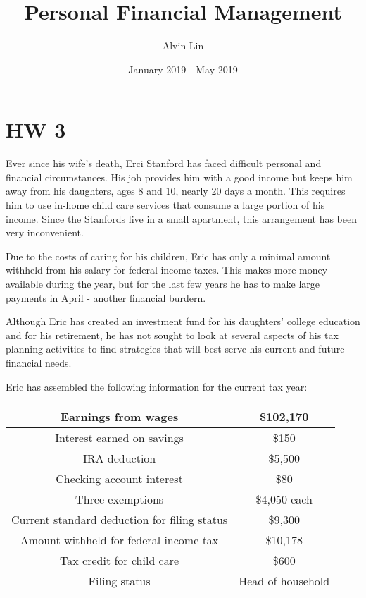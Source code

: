 \documentclass{math}
\title{Personal Financial Management}
\author{Alvin Lin}
\date{January 2019 - May 2019}
\begin{document}
\maketitle

\section*{HW 3}
Ever since his wife's death, Erci Stanford has faced difficult personal and
financial circumstances. His job provides him with a good income but keeps him
away from his daughters, ages 8 and 10, nearly 20 days a month. This requires
him to use in-home child care services that consume a large portion of his
income. Since the Stanfords live in a small apartment, this arrangement has been
very inconvenient. \par
Due to the costs of caring for his children, Eric has only a minimal amount
withheld from his salary for federal income taxes. This makes more money
available during the year, but for the last few years he has to make large
payments in April - another financial burdern. \par
Although Eric has created an investment fund for his daughters' college
education and for his retirement, he has not sought to look at several aspects
of his tax planning activities to find strategies that will best serve his
current and future financial needs. \par
Eric has assembled the following information for the current tax year:
\begin{center}
  \begin{tabular}{|c|c|}
    \hline
    Earnings from wages & \$102,170 \\
    \hline
    Interest earned on savings & \$150 \\
    \hline
    IRA deduction & \$5,500 \\
    \hline
    Checking account interest & \$80 \\
    \hline
    Three exemptions & \$4,050 each \\
    \hline
    Current standard deduction for filing status & \$9,300 \\
    \hline
    Amount withheld for federal income tax & \$10,178 \\
    \hline
    Tax credit for child care & \$600 \\
    \hline
    Filing status & Head of household \\
    \hline
  \end{tabular}
\end{center}
\end{document}
